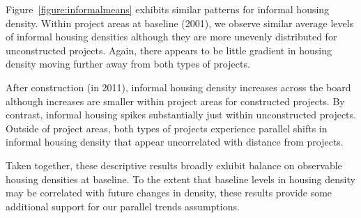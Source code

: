 \documentclass[12pt]{article}
\begin{document}
Figure~\ref{figure:informalmeans} exhibits similar patterns for informal housing density.  Within project areas at baseline (2001), we observe similar average levels of informal housing densities although they are more unevenly distributed for unconstructed projects.  Again, there appears to be little gradient in housing density moving further away from both types of projects.

After construction (in 2011), informal housing density increases across the board although increases are smaller within project areas for constructed projects.  By contrast, informal housing spikes substantially just within unconstructed projects.  Outside of project areas, both types of projects experience parallel shifts in informal housing density that appear uncorrelated with distance from projects.

Taken together, these descriptive results broadly exhibit balance on observable housing densities at baseline.  To the extent that baseline levels in housing density may be correlated with future changes in density, these results provide some additional support for our parallel trends assumptions.
\end{document}
